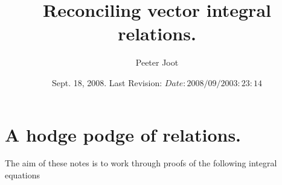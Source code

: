 \documentclass{article}
\title{ Reconciling vector integral relations. }
\author{Peeter Joot}
\date{ Sept. 18, 2008.  Last Revision: $Date: 2008/09/20 03:23:14 $ }
\begin{document}
\maketitle{}

\tableofcontents

\section{ A hodge podge of relations. }


The aim of these notes is to work through proofs of the following 
integral equations
\end{document}
